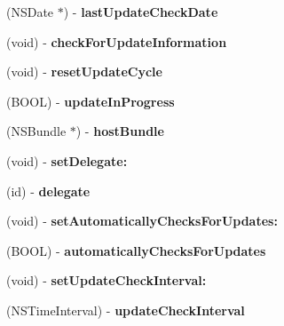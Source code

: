 \begin{DoxyCompactItemize}
(N\+S\+Date $\ast$) -\/ {\bfseries last\+Update\+Check\+Date}
\item 
\mbox{\label{interface_s_u_updater_a30b1f73644272e79aa653ddfc6cf7c92}} 
(void) -\/ {\bfseries check\+For\+Update\+Information}
\item 
\mbox{\label{interface_s_u_updater_acf7fce45848ddc896467b9ba3af3578b}} 
(void) -\/ {\bfseries reset\+Update\+Cycle}
\item 
\mbox{\label{interface_s_u_updater_ac9b96e237f0aae2f2b5fe773eea32925}} 
(B\+O\+OL) -\/ {\bfseries update\+In\+Progress}
\item 
\mbox{\label{interface_s_u_updater_a3faf834b08c495d58e81f232baec1402}} 
(N\+S\+Bundle $\ast$) -\/ {\bfseries host\+Bundle}
\item 
\mbox{\label{interface_s_u_updater_ae5ea4c7e9f17e85dc3dfc6f07abceb4e}} 
(void) -\/ {\bfseries set\+Delegate\+:}
\item 
\mbox{\label{interface_s_u_updater_a116a99749681ee2120eaa7abd5d94467}} 
(id) -\/ {\bfseries delegate}
\item 
\mbox{\label{interface_s_u_updater_a4f5761c4bd9357e920c89dd249246f4e}} 
(void) -\/ {\bfseries set\+Automatically\+Checks\+For\+Updates\+:}
\item 
\mbox{\label{interface_s_u_updater_a4bd04a9a76a7843e302cd5439f1a4214}} 
(B\+O\+OL) -\/ {\bfseries automatically\+Checks\+For\+Updates}
\item 
\mbox{\label{interface_s_u_updater_a6ec815c3716bdd1e7d9f611497070765}} 
(void) -\/ {\bfseries set\+Update\+Check\+Interval\+:}
\item 
\mbox{\label{interface_s_u_updater_a6ea74060ff35e0af22350dc8bba0d47b}} 
(N\+S\+Time\+Interval) -\/ {\bfseries update\+Check\+Interval}
\item 
\mbox{\label{interface_s_u_updater_aebf52689edbf7d167facb4bdf7ec4945}} 

\end{DoxyCompactItemize}
